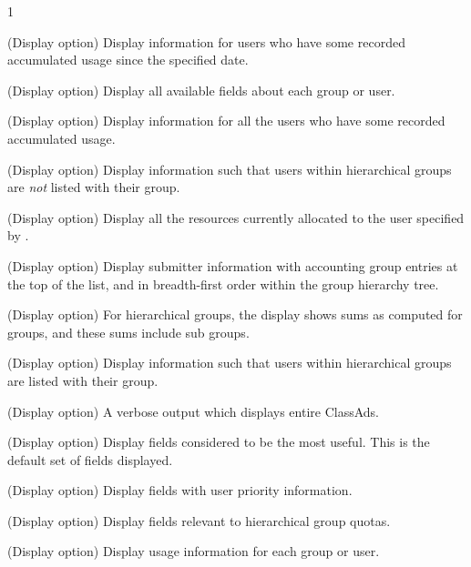 \begin{ManPage}{\label{man-condor-userprio}}{1}
\begin{Options}
  {(Display option) Display information for users who have 
  some recorded accumulated usage since the specified date.  }

  {(Display option) Display all available fields about each group or user.}

  {(Display option) Display information for all the users 
  who have some recorded accumulated usage.}

  {(Display option) Display information such that users within hierarchical
  groups are \emph{not} listed with their group. }

  {(Display option) Display all the resources currently allocated to the 
  user specified by .  }

  {(Display option) Display submitter information with accounting group
   entries at the top of the list, 
   and in breadth-first order within the group hierarchy tree.}

  {(Display option) For hierarchical groups,
  the display shows sums as computed for groups, 
  and these sums include sub groups.  }

  {(Display option) Display information such that users within hierarchical
  groups are listed with their group. }

  {(Display option) A verbose output which displays entire ClassAds.  }

  {(Display option) Display fields considered to be the most useful.
  This is the default set of fields displayed.   }

  {(Display option) Display fields with user priority information.  }

  {(Display option) Display fields relevant to hierarchical group quotas.  }

  {(Display option) Display usage information for each group or user.}

\end{Options}

\Examples


\end{ManPage}
